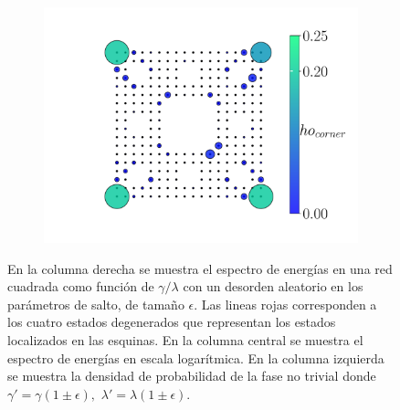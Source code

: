 \begin{figure}[h!]
\begin{minipage}[h!]{0.9\textwidth}
\begin{subfigure}[b!]{0.3 \textwidth}
         \end{subfigure}\hspace*{-0.5em}
         \begin{subfigure}[b!]{0.4 \textwidth}
             \caption*{}
             \includegraphics[width=\textwidth]{Imagenes/Resultados_Hoti_Fractal/proyection_square_0.5.pdf}
         \end{subfigure}\hspace*{-0.5em}
     \end{minipage}\vspace*{-0.5em}
     
     
    \caption{En la columna derecha se muestra el espectro de energías en una red cuadrada como función de $\gamma/\lambda $ con un desorden aleatorio en los parámetros de salto, de tamaño $\epsilon$. Las lineas rojas corresponden a los cuatro estados degenerados que representan los estados localizados en las esquinas. En la columna central se muestra el espectro de energías en escala logarítmica. En la columna izquierda se muestra la densidad de probabilidad de la fase no trivial donde $\gamma' = \gamma( 1 \pm \epsilon) ,\, \, \lambda' = \lambda( 1 \pm \epsilon)$.  }
    \label{fig:para_proy_Delta_fractal}
\end{figure}